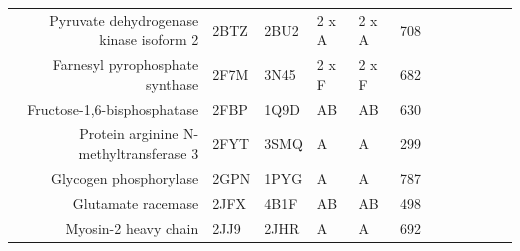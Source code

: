 \begin{table}
\begin{scriptsize}
\begin{tabular}{ r p{0.8cm} p{0.8cm} p{0.8cm} p{0.8cm} r r r r r r r }
\multicolumn{1}{r}{Pyruvate dehydrogenase kinase isoform 2} & \multicolumn{1}{l}{2BTZ} & \multicolumn{1}{l}{2BU2} & \multicolumn{1}{l}{2 x A} & \multicolumn{1}{l}{2 x A} & 708   & \cellcolor[rgb]{ 1,  .494,  .475}  & \cellcolor[rgb]{ 1,  .494,  .475}  & \cellcolor[rgb]{ 1,  .494,  .475}  & \cellcolor[rgb]{ 1,  .494,  .475}  & \cellcolor[rgb]{ 1,  .494,  .475}  & \cellcolor[rgb]{ 1,  .494,  .475}  \\
\multicolumn{1}{r}{Farnesyl pyrophosphate synthase} & \multicolumn{1}{l}{2F7M} & \multicolumn{1}{l}{3N45} & \multicolumn{1}{l}{2 x F} & \multicolumn{1}{l}{2 x F} & 682   & \cellcolor[rgb]{ .573,  .816,  .314}  & \cellcolor[rgb]{ .573,  .816,  .314}  & \cellcolor[rgb]{ 1,  .494,  .475}  & \cellcolor[rgb]{ 1,  .494,  .475}  & \cellcolor[rgb]{ .573,  .816,  .314}  & \cellcolor[rgb]{ 1,  .494,  .475}  \\
\multicolumn{1}{r}{Fructose-1,6-bisphosphatase} & \multicolumn{1}{l}{2FBP} & \multicolumn{1}{l}{1Q9D} & \multicolumn{1}{l}{AB} & \multicolumn{1}{l}{AB} & 630   & \cellcolor[rgb]{ 1,  .494,  .475}  & \cellcolor[rgb]{ 1,  .494,  .475}  & \cellcolor[rgb]{ .573,  .816,  .314}  & \cellcolor[rgb]{ 1,  .494,  .475}  & \cellcolor[rgb]{ 1,  .494,  .475}  & \cellcolor[rgb]{ 1,  .494,  .475}  \\
\multicolumn{1}{r}{Protein arginine N-methyltransferase 3} & \multicolumn{1}{l}{2FYT} & \multicolumn{1}{l}{3SMQ} & \multicolumn{1}{l}{A} & \multicolumn{1}{l}{A} & 299   & \cellcolor[rgb]{ 1,  .494,  .475}  & \cellcolor[rgb]{ .573,  .816,  .314}  & \cellcolor[rgb]{ .573,  .816,  .314}  & \cellcolor[rgb]{ 1,  .494,  .475}  & \cellcolor[rgb]{ .573,  .816,  .314}  & \cellcolor[rgb]{ .573,  .816,  .314}  \\
\multicolumn{1}{r}{Glycogen phosphorylase} & \multicolumn{1}{l}{2GPN} & \multicolumn{1}{l}{1PYG} & \multicolumn{1}{l}{A} & \multicolumn{1}{l}{A} & 787   & \cellcolor[rgb]{ .573,  .816,  .314}  & \cellcolor[rgb]{ 1,  .494,  .475}  & \cellcolor[rgb]{ 1,  .494,  .475}  & \cellcolor[rgb]{ 1,  .494,  .475}  & \cellcolor[rgb]{ 1,  .494,  .475}  & \cellcolor[rgb]{ 1,  .494,  .475}  \\
\multicolumn{1}{r}{Glutamate racemase} & \multicolumn{1}{l}{2JFX} & \multicolumn{1}{l}{4B1F} & \multicolumn{1}{l}{AB} & \multicolumn{1}{l}{AB} & 498   & \cellcolor[rgb]{ 1,  .494,  .475}  & \cellcolor[rgb]{ 1,  .494,  .475}  & \cellcolor[rgb]{ 1,  .494,  .475}  & \cellcolor[rgb]{ 1,  .494,  .475}  & \cellcolor[rgb]{ 1,  .494,  .475}  & \cellcolor[rgb]{ 1,  .494,  .475}  \\
\multicolumn{1}{r}{Myosin-2 heavy chain} & \multicolumn{1}{l}{2JJ9} & \multicolumn{1}{l}{2JHR} & \multicolumn{1}{l}{A} & \multicolumn{1}{l}{A} & 692   & \cellcolor[rgb]{ .573,  .816,  .314}  & \cellcolor[rgb]{ .573,  .816,  .314}  & \cellcolor[rgb]{ .573,  .816,  .314}  & \cellcolor[rgb]{ .573,  .816,  .314}  & \cellcolor[rgb]{ .573,  .816,  .314}  & \cellcolor[rgb]{ .573,  .816,  .314}  \\

\end{tabular}
\end{scriptsize}
\end{table}
